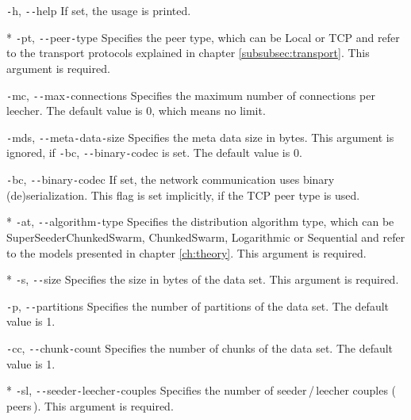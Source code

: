 \begin{flushleft}
\texttt{-}h, \texttt{-{}-}help
\linebreak
If set, the usage is printed.



* \texttt{-}pt, \texttt{-{}-}peer\texttt{-}type
\linebreak
Specifies the peer type, which can be Local or TCP and refer to the transport protocols explained in chapter \ref{subsubsec:transport}. This argument is required.

\texttt{-}mc, \texttt{-{}-}max\texttt{-}connections
\linebreak
Specifies the maximum number of connections per leecher. The default value is 0, which means no limit.

\texttt{-}mds, \texttt{-{}-}meta\texttt{-}data\texttt{-}size
\linebreak
Specifies the meta data size in bytes. This argument is ignored, if \texttt{-}bc, \texttt{-{}-}binary\texttt{-}codec is set. The default value is 0.

\texttt{-}bc, \texttt{-{}-}binary\texttt{-}codec
\linebreak
If set, the network communication uses binary (de)serialization. This flag is set implicitly, if the TCP peer type is used.



* \texttt{-}at, \texttt{-{}-}algorithm\texttt{-}type
\linebreak
Specifies the distribution algorithm type, which can be SuperSeederChunkedSwarm, ChunkedSwarm, Logarithmic or Sequential and refer to the models presented in chapter \ref{ch:theory}. This argument is required.



* \texttt{-}s, \texttt{-{}-}size
\linebreak
Specifies the size in bytes of the data set. This argument is required.

\texttt{-}p, \texttt{-{}-}partitions
\linebreak
Specifies the number of partitions of the data set. The default value is 1.

\texttt{-}cc, \texttt{-{}-}chunk\texttt{-}count
\linebreak  
Specifies the number of chunks of the data set. The default value is 1.



* \texttt{-}sl, \texttt{-{}-}seeder\texttt{-}leecher\texttt{-}couples
\linebreak
Specifies the number of seeder\,/\,leecher couples (\,peers\,). This argument is required.


\end{flushleft}
